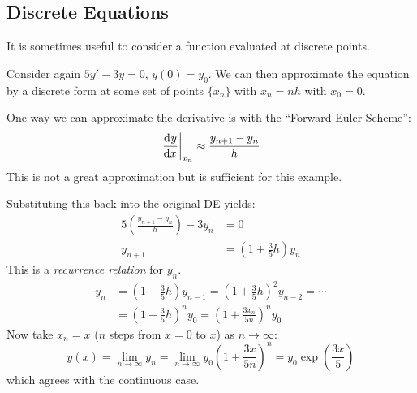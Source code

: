 \documentclass[../main.tex]{subfiles}
\begin{document}
\subsection{Discrete Equations}
It is sometimes useful to consider a function evaluated at discrete points.
\begin{example}
  Consider again $5y' - 3y = 0$, $y(0) = y_0$.
  We can then approximate the equation by a discrete form at some set of points $\{x_n\}$ with $x_n = nh$ with $x_0 = 0$.

  One way we can approximate the derivative is with the ``Forward Euler Scheme'':
  \[
    \at{\deriv{y}{x}}{x_n} \approx \frac{y_{n+1} - y_n}{h}
  \]
  This is not a great approximation but is sufficient for this example.
  \begin{center}
  \end{center}
  Substituting this back into the original DE yields:
  \begin{align*}
    5\left(\frac{y_{n+1}-y_n}{h}\right) - 3y_n &= 0 \\
    y_{n+1} &= \left(1 + \frac{3}{5}h\right)y_n
  \end{align*}
  This is a \textit{recurrence relation} for $y_n$.
  \begin{align*}
    y_n &= \left(1 + \frac{3}{5}h\right)y_{n-1} = \left(1 + \frac{3}{5}h\right)^2 y_{n - 2} = \cdots \\
        &= \left(1 + \frac{3}{5}h\right)^{n}y_0 = \left(1 + \frac{3x_n}{5n}\right)^{n}y_0
  \end{align*}
  Now take $x_n = x$ ($n$ steps from $x = 0$ to $x$) as $n \to \infty$:
  \[
    y(x) = \lim_{n \to \infty} y_n = \lim_{n \to \infty} y_0 \left(1 + \frac{3x}{5n}\right)^{n} = y_0 \exp\left(\frac{3x}{5}\right)
  \]
  which agrees with the continuous case.
\end{example}
\end{document}
